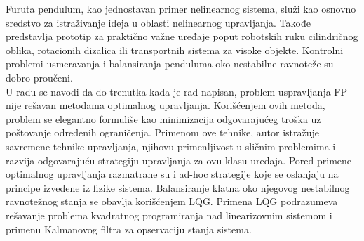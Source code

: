 \documentclass[a4paper,11pt]{article}
\theoremstyle{definition} \newtheorem{deff}{Definicija}[section]
\theoremstyle{definition} \newtheorem{prim}[deff]{Primer}
\theoremstyle{plain} \newtheorem{teor}[deff]{Teorema}
\begin{document}
	
	
	Furuta pendulum, kao jednostavan primer nelinearnog sistema, služi kao osnovno sredstvo za istraživanje ideja u oblasti nelinearnog upravljanja. Takođe predstavlja prototip za praktično važne uređaje poput robotskih ruku cilindričnog oblika, rotacionih dizalica ili transportnih sistema za visoke objekte. Kontrolni problemi usmeravanja i balansiranja penduluma oko nestabilne ravnoteže su dobro proučeni.\\
	
	U radu \cite{inicijalna} se navodi da do trenutka kada je rad napisan, problem uspravljanja FP nije rešavan metodama optimalnog upravljanja. Korišćenjem ovih metoda, problem se elegantno formuliše kao minimizacija odgovarajućeg troška uz poštovanje određenih ograničenja. Primenom ove tehnike, autor istražuje savremene tehnike upravljanja, njihovu primenljivost u sličnim problemima i razvija odgovarajuću strategiju upravljanja za ovu klasu uređaja. Pored primene optimalnog upravljanja razmatrane su i ad-hoc strategije koje se oslanjaju na principe izvedene iz fizike sistema. Balansiranje klatna oko njegovog nestabilnog ravnotežnog stanja se obavlja korišćenjem LQG. Primena LQG podrazumeva rešavanje problema kvadratnog programiranja nad linearizovnim sistemom i primenu Kalmanovog filtra za opservaciju stanja sistema. \\
	
	
	
	
	
	
	
	
\end{document}
